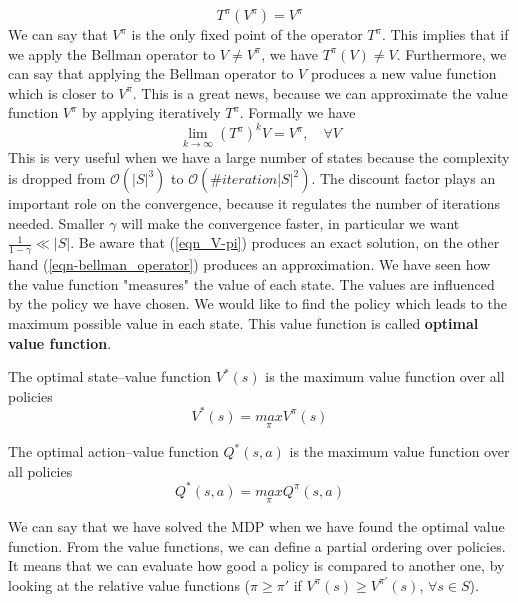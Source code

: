 \documentclass[main.tex]{subfiles}
\begin{document}
\begin{equation}
T^{\pi}(V^{\pi}) = V^{\pi}
\end{equation}
We can say that $V^{\pi}$ is the only fixed point\footnotemark {} of the operator $T^{\pi}$. This implies that if we apply the Bellman operator to $V \neq V^{\pi}$, we have $T^{\pi}(V) \neq V$. Furthermore, we can say that applying the Bellman operator to $V$ produces a new value function which is closer to $V^{\pi}$. This is a great news, because we can approximate the value function $V^{\pi}$ by applying iteratively $T^{\pi}$. Formally we have
\begin{equation}
    \lim_{k \rightarrow \infty} (T^{\pi})^k V = V^{\pi}, \quad \forall V \label{eqn-bellman_operator}
\end{equation}
This is very useful when we have a large number of states because the complexity is dropped from $\mathcal{O}(|S|^3)$ to $\mathcal{O}(\#iteration|S|^2)$. The discount factor plays an important role on the convergence, because it regulates the number of iterations needed. Smaller $\gamma$ will make the convergence faster, in particular we want $\frac{1}{1-\gamma} \ll |S|$.
Be aware that (\ref{eqn_V-pi}) produces an exact solution, on the other hand (\ref{eqn-bellman_operator}) produces an approximation.
\newline
We have seen how the value function "measures" the value of each state. The values are influenced by the policy we have chosen. We would like to find the policy which leads to the maximum possible value in each state. This value function is called \textbf{optimal value function}.
\begin{definition}
The optimal state–value function $V^*(s)$ is the maximum value function over all policies
\begin{equation}
    V^*(s) = \underset{\pi}{max} V^{\pi}(s)
\end{equation}
\end{definition}
\begin{definition}
The optimal action–value function $Q^*(s,a)$ is the maximum value function over all policies
\begin{equation}
    Q^*(s,a) = \underset{\pi}{max} Q^{\pi}(s,a)
\end{equation}
\end{definition}
We can say that we have solved the MDP when we have found the optimal value function. From the value functions, we can define a partial ordering over policies. It means that we can evaluate how good a policy is compared to another one, by looking at the relative value functions ($\pi \geq \pi'$ if $V^{\pi}(s) \geq V^{\pi'}(s)$, $\forall s \in S$).
\end{document}
